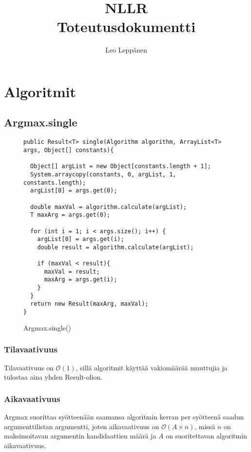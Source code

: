 \documentclass[12pt,a4paper]{article}
\author{Leo Leppänen}
\title{NLLR \\ Toteutusdokumentti}
\begin{document}
\maketitle

\tableofcontents

\pagebreak

\section{Algoritmit}

\subsection{Argmax.single}

\begin{figure}[H]
\begin{lstlisting}
public Result<T> single(Algorithm algorithm, ArrayList<T> args, Object[] constants){
                        
  Object[] argList = new Object[constants.length + 1];
  System.arraycopy(constants, 0, argList, 1, constants.length);      
  argList[0] = args.get(0);
  
  double maxVal = algorithm.calculate(argList);
  T maxArg = args.get(0);
      
  for (int i = 1; i < args.size(); i++) {
    argList[0] = args.get(i);
    double result = algorithm.calculate(argList);
    
    if (maxVal < result){
      maxVal = result;
      maxArg = args.get(i);
    }
  }  
  return new Result(maxArg, maxVal);
}
\end{lstlisting}
\caption{Argmax.single()}
\end{figure}

\subsubsection*{Tilavaativuus}
Tilavaativuus on $\mathcal{O}(1)$, sillä algoritmit käyttää vakiomäärää muuttujia ja tulostaa aina yhden Result-olion.

\subsubsection*{Aikavaativuus}
Argmax suorittaa syötteenään saamansa algoritmin kerran per syötteenä saadun argumenttilistan argumentti, joten aikavaativuus on $\mathcal{O}(A \times n)$, missä $n$ on maksimoitavan argumentin kandidaattien määrä ja $A$ on suoritettavan algoritmin aikavaativuus.
\end{document}
